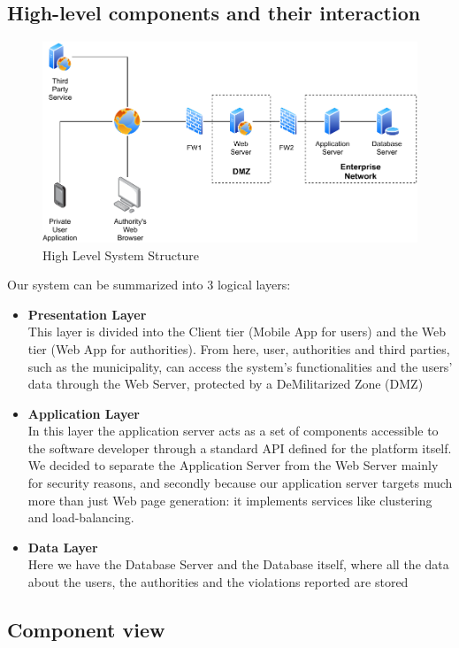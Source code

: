 \documentclass[12pt,a4paper]{article}
\begin{document}
\subsection{High-level components and their interaction}
\begin{figure}[H]
		\centering
		\includegraphics[width=0.9\linewidth]{../assets/sequence_diagrams/exports/architecture.pdf}
		\caption{High Level System Structure}
	\end{figure}
Our system can be summarized into 3 logical layers:
\begin{itemize}
\item \textbf{Presentation Layer}\\
This layer is divided into the Client tier (Mobile App for users) and the Web tier (Web App for authorities). From here, user, authorities and third parties, such as the municipality, can access the system's functionalities and the users' data through the Web Server, protected by a DeMilitarized Zone (DMZ)
\item \textbf{Application Layer}\\
In this layer the application server acts as a set of components accessible to the software developer through a standard API defined for the platform itself. We decided to separate the Application Server from the Web Server mainly for security reasons, and secondly because our application server targets much more than just Web page generation: it implements services like clustering and load-balancing.
\item \textbf{Data Layer}\\
Here we have the Database Server and the Database itself, where all the data about the users, the authorities and the violations reported are stored\\
\end{itemize}
\subsection{Component view}
\end{document}
